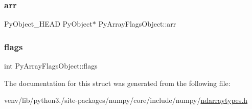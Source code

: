 \subsubsection{\texorpdfstring{arr}{arr}}
{\footnotesize\ttfamily Py\+Object\+\_\+\+H\+E\+AD Py\+Object$\ast$ Py\+Array\+Flags\+Object\+::arr}

\mbox{\label{structPyArrayFlagsObject_ab7f33743a6d4dd8d4918d92c0ea3e84d}} 
\subsubsection{\texorpdfstring{flags}{flags}}
{\footnotesize\ttfamily int Py\+Array\+Flags\+Object\+::flags}



The documentation for this struct was generated from the following file\+:\begin{DoxyCompactItemize}
\item 
venv/lib/python3./site-\/packages/numpy/core/include/numpy/\hyperlink{ndarraytypes_8h}{ndarraytypes.\+h}\end{DoxyCompactItemize}

